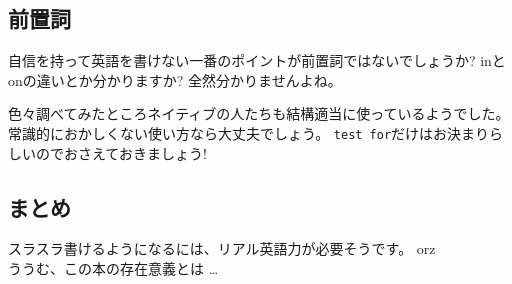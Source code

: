\documentclass{jarticle}
\begin{document}
  \subsection{前置詞}
  自信を持って英語を書けない一番のポイントが前置詞ではないでしょうか?
  inとonの違いとか分かりますか? 全然分かりませんよね。

  色々調べてみたところネイティブの人たちも結構適当に使っているようでした。
  常識的におかしくない使い方なら大丈夫でしょう。
  {\tt test for}だけはお決まりらしいのでおさえておきましょう!

  \subsection{まとめ}
  スラスラ書けるようになるには、リアル英語力が必要そうです。 orz\\
  ううむ、この本の存在意義とは \dots
\end{document}
